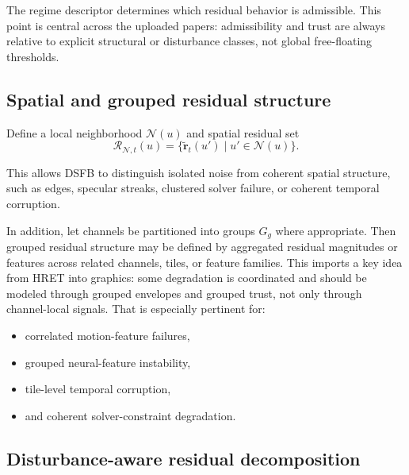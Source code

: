 \documentclass[11pt,letterpaper]{article}
\theoremstyle{gcresult}
\theoremstyle{definition}
\begin{document}
The regime descriptor determines which residual behavior is admissible. This point is central across the uploaded papers: admissibility and trust are always relative to explicit structural or disturbance classes, not global free-floating thresholds. 


\subsection{Spatial and grouped residual structure}

Define a local neighborhood $\mathcal N(u)$ and spatial residual set
\begin{equation}
\mathcal R_{\mathcal N,t}(u)=\{\tilde{\mathbf r}_t(u')\mid u'\in\mathcal N(u)\}.
\end{equation}

This allows DSFB to distinguish isolated noise from coherent spatial structure, such as edges, specular streaks, clustered solver failure, or coherent temporal corruption.

In addition, let channels be partitioned into groups $G_g$ where appropriate. Then grouped residual structure may be defined by aggregated residual magnitudes or features across related channels, tiles, or feature families. This imports a key idea from HRET into graphics: some degradation is coordinated and should be modeled through grouped envelopes and grouped trust, not only through channel-local signals. That is especially pertinent for:
\begin{itemize}[leftmargin=1.5em]
    \item correlated motion-feature failures,
    \item grouped neural-feature instability,
    \item tile-level temporal corruption,
    \item and coherent solver-constraint degradation.
\end{itemize}



\subsection{Disturbance-aware residual decomposition}
\end{document}
